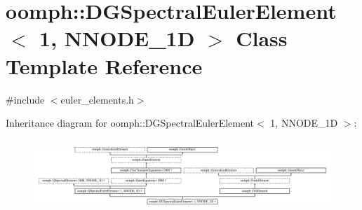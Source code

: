 \hypertarget{classoomph_1_1DGSpectralEulerElement_3_011_00_01NNODE__1D_01_4}{}\section{oomph\+:\+:D\+G\+Spectral\+Euler\+Element$<$ 1, N\+N\+O\+D\+E\+\_\+1D $>$ Class Template Reference}
\label{classoomph_1_1DGSpectralEulerElement_3_011_00_01NNODE__1D_01_4}


{\ttfamily \#include $<$euler\+\_\+elements.\+h$>$}

Inheritance diagram for oomph\+:\+:D\+G\+Spectral\+Euler\+Element$<$ 1, N\+N\+O\+D\+E\+\_\+1D $>$\+:\begin{figure}[H]
\begin{center}
\leavevmode
\includegraphics[height=2.709677cm]{classoomph_1_1DGSpectralEulerElement_3_011_00_01NNODE__1D_01_4}
\end{center}
\end{figure}
